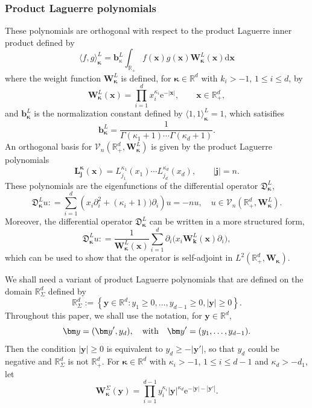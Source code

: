 \documentclass{amsart}
\theoremstyle{remark}
\def\la{{\langle}}
\def\ra{{\rangle}}
\def\d{\mathrm{d}}
\def\e{\mathrm{e}}
\def\fD{{\mathfrak D}}
\def\k{{\kappa}}
\def\la{{\langle}}
\def\ra{{\rangle}}
\def\bb{{\bm b}}
\def\jb{{\bm j}}
\def\kb{{\bm k}}
\def\xb{{\bm x}}
\def\yb{{\bm y}}
\def\Lb{{\bm L}}
\def\Wb{{\bm W}}
\def\CV{{\mathcal V}}
\def\RR{{\mathbb R}}
\def\bk{{\boldsymbol{\kappa}}}
\begin{document}
 \subsubsection{Product Laguerre polynomials}
These polynomials are orthogonal with respect to the product Laguerre inner product defined by
$$
  \la f, g\ra_{\bk}^L = \bb_\k^L \int_{\RR_+} f(\xb) g(\xb) \Wb_\bk^L (\xb) \d \xb
$$
where the weight function $\Wb_\bk^L$ is defined, for $\bk \in \RR^d$ with $k_i > -1$, $1 \le i \le d$, by 
\begin{equation}\label{eq:W_L}
    \Wb_\bk^L(\xb) = \prod_{i=1}^d x_i^{\k_i} \e^{- |\xb|}, \qquad \xb \in \RR_+^d,
\end{equation}
and $\bb_\bk^L$ is the normalization constant defined by $\la 1,1\ra_\bk^L = 1$, which satisifies
$$
   \bb_\bk^L = \frac{1}{ \Gamma(\k_1+1) \cdots \Gamma(\k_d+1)}. 
$$
An orthogonal basis for $\CV_n(\RR_+^d, \Wb_\bk^L)$ is given by the product Laguerre polynomials 
\begin{equation}\label{eq:prod_L}
    \Lb_{\jb}^\bk (\xb) = L_{j_1}^{\k_1}(x_1) \cdots  L_{j_d}^{\k_d}(x_d), \qquad |\jb|= n. 
\end{equation}
These polynomials are the eigenfunctions of the differential operator $\fD_\bk^L$,
\begin{equation}\label{eq:diff_prod_L}
   \fD_\bk^L u : = \sum_{i=1}^d \left(x_i \partial_i^2 + (\k_i + 1)) \partial_i \right) u   = - n u, 
    \quad u \in \CV_n\left(\RR_+^d, \bm W_\bk^L\right).  
\end{equation}
Moreover, the differential operator $\fD_\bk^L$ can be written in a more structured form,
\begin{equation}\label{eq:diff_prod_L2}
   \fD_\bk^L u : = \frac{1}{\Wb_\bk^L(\xb)}  \sum_{i=1}^d  \partial_i \big(x_i \Wb_\kb^L (\xb) \partial_i\big),
\end{equation}
which can be used to show that the operator is self-adjoint in $L^2(\RR_+^d, \Wb_\bk)$.

We shall need a variant of product Laguerre polynomials that are defined on the domain $\RR_\Sigma^d$ defined by
$$
  \RR_\Sigma^d := \left \{\yb \in \RR^d: y_1\ge 0, \ldots, y_{d-1} \ge 0, |\yb| \ge 0\right\}.
$$
Throughout this paper, we shall use the notation, for $ \yb \in \RR^d$, 
$$
   \yb = (\yb', y_d), \quad \hbox{with} \quad \yb' = (y_1,\ldots, y_{d-1}). 
$$
Then the condition $|\yb| \ge 0$ is equivalent to $y_d \ge - |\yb '|$, so that $y_d$ could be negative and $\RR_\Sigma^d$ is not 
$\RR_+^d$. For $\bk \in \RR^d$ with $\k_i > -1$, $1 \le i \le d-1$ and $\k_d > - d_1$, let 
\begin{equation} \label{eq:LaguerreSig}
   \Wb_\bk^\Sigma(\yb) = \prod_{i=1}^{d-1} y_i^{\k_i} |\yb|^{\k_d} \e^{-|\yb|-|\yb'|}. 
\end{equation}
\end{document}
